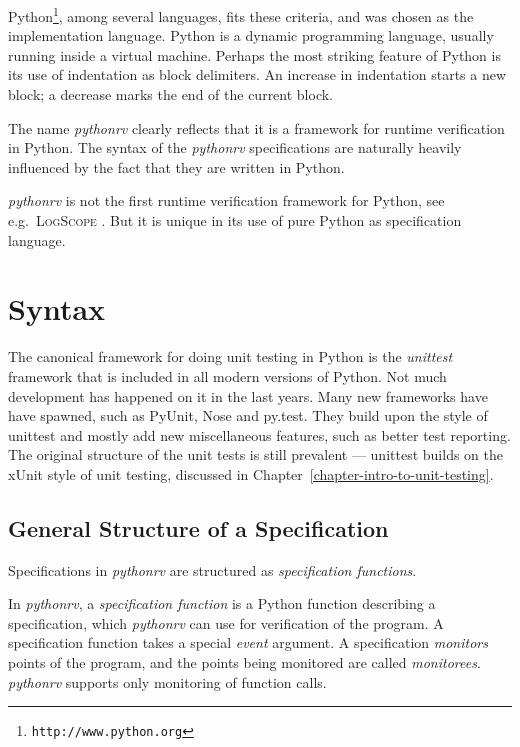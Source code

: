 Python\footnote{\texttt{http://www.python.org}}, among several languages, fits
these criteria, and was chosen as the implementation language. Python is a
dynamic programming language, usually running inside a virtual machine.
Perhaps the most striking feature of Python is its use of indentation as block
delimiters. An increase in indentation starts a new block; a decrease marks the
end of the current block.

The name \textit{pythonrv} clearly reflects that it is a framework for runtime
verification in Python. The syntax of the \textit{pythonrv} specifications are
naturally heavily influenced by the fact that they are written in Python.

\textit{pythonrv} is not the first runtime verification framework for Python,
see e.g.\ \textsc{LogScope} \cite{barringer09tutorial}. But it is unique in its
use of pure Python as specification language.


\section{Syntax} \label{section-approach-syntax}

The canonical framework for doing unit testing in Python is the
\textit{unittest} framework that is included in all modern versions of Python.
Not much development has happened on it in the last years. Many new frameworks
have have spawned, such as PyUnit, Nose and py.test. They build upon the style
of unittest and mostly add new miscellaneous features, such as better test
reporting. The original structure of the unit tests is still prevalent ---
unittest builds on the xUnit style of unit testing, discussed in
Chapter~\ref{chapter-intro-to-unit-testing}.

\subsection{General Structure of a Specification}

Specifications in \textit{pythonrv} are structured as \textit{specification
functions}.

\begin{mydef}\label{def-specification-function}
In \textit{pythonrv}, a \textit{specification function} is a Python function
describing a specification, which \textit{pythonrv} can use for verification of
the program. A specification function takes a special \textit{event} argument.
A specification \textit{monitors} points of the program, and the points being
monitored are called \textit{monitorees}. \textit{pythonrv} supports only
monitoring of function calls.
\end{mydef}

